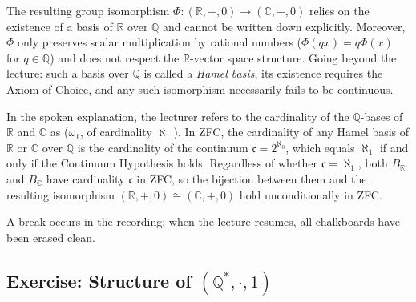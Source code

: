 \begin{content}
\begin{steps}
The resulting group isomorphism $\Phi \colon (\mathbb{R}, +, 0) \to (\mathbb{C}, +, 0)$ relies on the existence of a basis of $\mathbb{R}$ over $\mathbb{Q}$ and cannot be written down explicitly. Moreover, $\Phi$ only preserves scalar multiplication by rational numbers ($\Phi(qx) = q\Phi(x)$ for $q \in \mathbb{Q}$) and does not respect the $\mathbb{R}$-vector space structure. Going beyond the lecture: such a basis over $\mathbb{Q}$ is called a \emph{Hamel basis}, its existence requires the Axiom of Choice, and any such isomorphism necessarily fails to be continuous.
\end{steps}
\end{content}

\begin{aiNote}
In the spoken explanation, the lecturer refers to the cardinality of the $\mathbb{Q}$-bases of $\mathbb{R}$ and $\mathbb{C}$ as  ($\omega_1$, of cardinality $\aleph_1$). In ZFC, the cardinality of any Hamel basis of $\mathbb{R}$ or $\mathbb{C}$ over $\mathbb{Q}$ is the cardinality of the continuum $\mathfrak{c} = 2^{\aleph_0}$, which equals $\aleph_1$ if and only if the Continuum Hypothesis holds. Regardless of whether $\mathfrak{c} = \aleph_1$, both $B_{\mathbb{R}}$ and $B_{\mathbb{C}}$ have cardinality $\mathfrak{c}$ in ZFC, so the bijection between them and the resulting isomorphism $(\mathbb{R}, +, 0) \cong (\mathbb{C}, +, 0)$ hold unconditionally in ZFC.
\end{aiNote}

\begin{hidden}
\end{hidden}

\begin{pause}
A break occurs in the recording; when the lecture resumes, all chalkboards have been erased clean.
\end{pause}

\subsection{Exercise: Structure of \texorpdfstring{$(\mathbb{Q}^*, \cdot, 1)$}{(Q*, *, 1)}}

